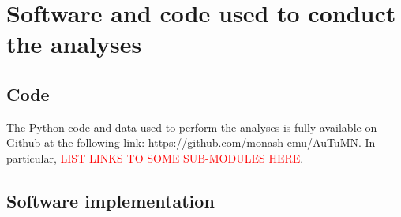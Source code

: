 \section{Software and code used to conduct the analyses}

\subsection{Code}
The Python code and data used to perform the analyses is fully available on Github at the following link:
\href{https://github.com/monash-emu/AuTuMN}{https://github.com/monash-emu/AuTuMN}. In particular, \textcolor{red}{LIST LINKS TO SOME SUB-MODULES HERE}.


\subsection{Software implementation}
